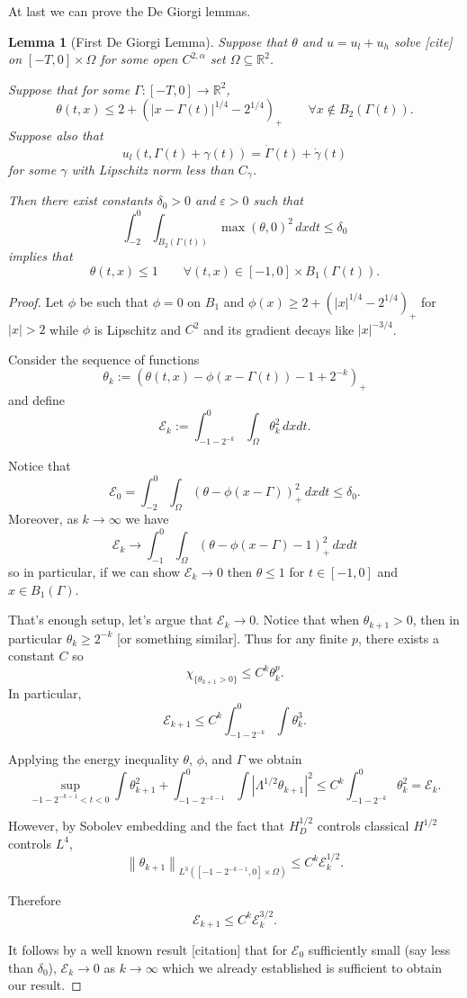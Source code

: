 \documentclass[11pt]{amsart}
\newtheorem{lemma}[theorem]{Lemma}
\theoremstyle{remark}
\theoremstyle{definition}
\newcommand{\R}{\mathbb{R}}
\newcommand{\E}{\mathcal{E}}
\newcommand{\eps}{\varepsilon}
\newcommand{\norm}[1]{\left\lVert#1\right\rVert}
\newcommand{\paren}[1]{\left( #1 \right)}
\newcommand{\abs}[1]{\left\lvert #1 \right\rvert}
\newcommand{\indic}[1]{\chi_{\{#1\}}}
\newcommand{\ulow}{u_l}
\newcommand{\uhigh}{u_h}
\begin{document}
At last we can prove the De Giorgi lemmas.  

\begin{lemma}[First De Giorgi Lemma] \label{thm:DG1}
Suppose that $\theta$ and $u = \ulow + \uhigh$ solve [cite] on $[-T,0]\times \Omega$ for some open $C^{2,\alpha}$ set $\Omega \subseteq \R^2$.  

Suppose that for some $\Gamma:[-T,0]\to \R^2$, 
\[ \theta(t,x) \leq 2 + \paren{|x-\Gamma(t)|^{1/4}-2^{1/4}}_+ \qquad \forall x \notin B_2(\Gamma(t)). \]
Suppose also that
\[ \ulow(t,\Gamma(t)+\gamma(t)) = \dot{\Gamma}(t) + \dot{\gamma}(t) \]
for some $\gamma$ with Lipschitz norm less than $C_\gamma$.  

Then there exist constants $\delta_0>0$ and $\eps > 0$ such that
\[ \int_{-2}^0 \int_{B_2(\Gamma(t))} \max(\theta,0)^2 \,dxdt \leq \delta_0 \]
implies that
\[ \theta(t,x) \leq 1 \qquad \forall (t,x) \in [-1,0]\times B_1(\Gamma(t)). \]

\end{lemma}

\begin{proof}
Let $\phi$ be such that $\phi = 0$ on $B_1$ and $\phi(x) \geq 2 + \paren{|x|^{1/4}-2^{1/4}}_+$ for $|x|>2$ while $\phi$ is Lipschitz and $C^2$ and its gradient decays like $|x|^{-3/4}$.  

Consider the sequence of functions
\[ \theta_k := (\theta(t,x) - \phi(x - \Gamma(t)) - 1 + 2^{-k})_+ \]
and define
\[ \E_k := \int_{-1-2^{-k}}^0 \int_\Omega \theta_k^2 \,dxdt. \]

Notice that
\[ \E_0 = \int_{-2}^0 \int_\Omega (\theta - \phi(x-\Gamma))_+^2 \,dxdt \leq \delta_0. \]
Moreover, as $k \to \infty$ we have
\[ \E_k \to \int_{-1}^0 \int_\Omega (\theta - \phi(x-\Gamma) - 1)_+^2 \,dxdt \]
so in particular, if we can show $\E_k \to 0$ then $\theta \leq 1$ for $t \in [-1,0]$ and $x \in B_1(\Gamma)$.  

That's enough setup, let's argue that $\E_k \to 0$.  Notice that when $\theta_{k+1}>0$, then in particular $\theta_k \geq 2^{-k}$ [or something similar].  Thus for any finite $p$, there exists a constant $C$ so
\[ \indic{\theta_{k+1}>0} \leq C^k \theta_k^p. \]
In particular,
\[ \E_{k+1} \leq C^k \int_{-1-2^{-k}}^0 \int \theta_k^3. \]

Applying the energy inequality $\theta$, $\phi$, and $\Gamma$ we obtain
\[ \sup_{-1-2^{-k-1}<t<0} \int \theta_{k+1}^2 + \int_{-1-2^{-k-1}}^0 \int \abs{\Lambda^{1/2}\theta_{k+1}}^2 \leq C^k \int_{-1-2^{-k}}^0 \theta_k^2 = \E_k. \]

However, by Sobolev embedding and the fact that $H_D^{1/2}$ controls classical $H^{1/2}$ controls $L^4$,
\[ \norm{\theta_{k+1}}_{L^3([-1-2^{-k-1},0]\times\Omega)} \leq C^k \E_k^{1/2}. \]

Therefore
\[ \E_{k+1} \leq C^k \E_k^{3/2}. \]

It follows by a well known result [citation] that for $\E_0$ sufficiently small (say less than $\delta_0$), $\E_k \to 0$ as $k \to \infty$ which we already established is sufficient to obtain our result.  
\end{proof}
\end{document}
